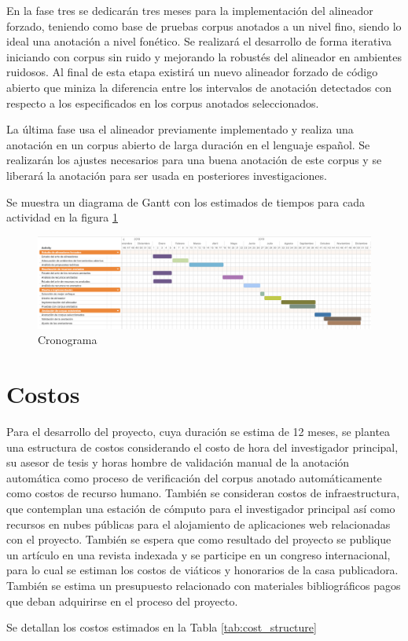 En la fase tres se dedicarán tres meses para la implementación del alineador forzado, teniendo como base de pruebas corpus anotados a un nivel fino, siendo lo ideal una anotación a nivel fonético. Se realizará el desarrollo de forma iterativa iniciando con corpus sin ruido y mejorando la robustés del alineador en ambientes ruidosos. Al final de esta etapa existirá un nuevo alineador forzado de código abierto que miniza la diferencia entre los intervalos de anotación detectados con respecto a los especificados en los corpus anotados seleccionados.

La última fase usa el alineador previamente implementado y realiza una anotación en un corpus abierto de larga duración en el lenguaje español. Se realizarán los ajustes necesarios para una buena anotación de este corpus y se liberará la anotación para ser usada en posteriores investigaciones.

Se muestra un diagrama de Gantt con los estimados de tiempos para cada actividad en la figura \ref{img:schedule}

\begin{landscape}
\begin{figure}[H]

\centering
\caption{Cronograma}
\label{img:schedule}
\includegraphics[scale=0.40]{images/schedule.png}

\end{figure}
\end{landscape}


\section{Costos}

Para el desarrollo del proyecto, cuya duración se estima de 12 meses, se plantea una estructura de costos considerando el costo de hora del investigador principal, su asesor de tesis y horas hombre de validación manual de la anotación automática como proceso de verificación del corpus anotado automáticamente como costos de recurso humano. También se consideran costos de infraestructura, que contemplan una estación de cómputo para el investigador principal así como recursos en nubes públicas para el alojamiento de aplicaciones web relacionadas con el proyecto. También se espera que como resultado del proyecto se publique un artículo en una revista indexada y se participe en un congreso internacional, para lo cual se estiman los costos de viáticos y honorarios de la casa publicadora. También se estima un presupuesto relacionado con materiales bibliográficos pagos que deban adquirirse en el proceso del proyecto. 

Se detallan los costos estimados en la Tabla \ref{tab:cost_structure}


